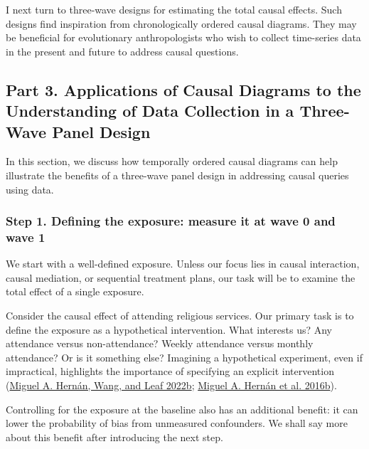 \documentclass[
  singlecolumn]{article}
\begin{document}
I next turn to three-wave designs for estimating the total causal
effects. Such designs find inspiration from chronologically ordered
causal diagrams. They may be beneficial for evolutionary anthropologists
who wish to collect time-series data in the present and future to
address causal questions.

\hypertarget{part-3.-applications-of-causal-diagrams-to-the-understanding-of-data-collection-in-a-three-wave-panel-design}{%
\subsection{Part 3. Applications of Causal Diagrams to the Understanding
of Data Collection in a Three-Wave Panel
Design}\label{part-3.-applications-of-causal-diagrams-to-the-understanding-of-data-collection-in-a-three-wave-panel-design}}

In this section, we discuss how temporally ordered causal diagrams can
help illustrate the benefits of a three-wave panel design in addressing
causal queries using data.

\hypertarget{step-1.-defining-the-exposure-measure-it-at-wave-0-and-wave-1}{%
\subsubsection{Step 1. Defining the exposure: measure it at wave 0 and
wave
1}\label{step-1.-defining-the-exposure-measure-it-at-wave-0-and-wave-1}}

We start with a well-defined exposure. Unless our focus lies in causal
interaction, causal mediation, or sequential treatment plans, our task
will be to examine the total effect of a single exposure.

Consider the causal effect of attending religious services. Our primary
task is to define the exposure as a hypothetical intervention. What
interests us? Any attendance versus non-attendance? Weekly attendance
versus monthly attendance? Or is it something else? Imagining a
hypothetical experiment, even if impractical, highlights the importance
of specifying an explicit intervention
(\protect\hyperlink{ref-hernuxe1n2022}{Miguel A. Hernán, Wang, and Leaf
2022b}; \protect\hyperlink{ref-hernuxe1n2016a}{Miguel A. Hernán et al.
2016b}).

Controlling for the exposure at the baseline also has an additional
benefit: it can lower the probability of bias from unmeasured
confounders. We shall say more about this benefit after introducing the
next step.
\end{document}
